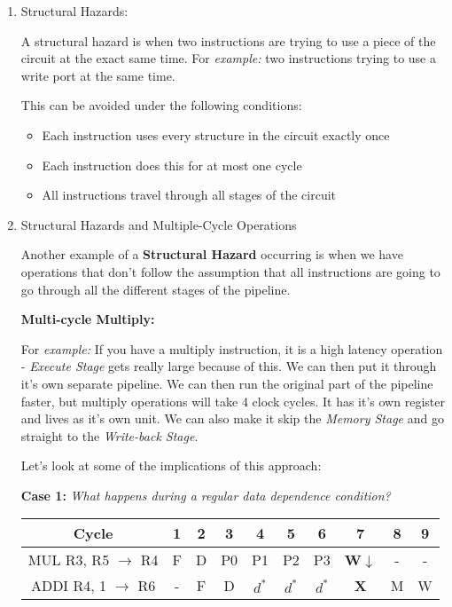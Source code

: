 \documentclass[12pt]{article}
\newenvironment{QandA}{\begin{enumerate}[label=\bfseries\alph*.]\bfseries}
                      {\end{enumerate}}
\newenvironment{answered}{\par\quad\normalfont}{}
\begin{document}
\begin{QandA}
    \item Structural Hazards:
    \begin{answered}
        A structural hazard is when two instructions are trying to use a piece of the circuit at the exact same time. For \textit{example:} two instructions trying to use a write port at the same time. 
        
        This can be avoided under the following conditions:
        \begin{itemize}
            \item Each instruction uses every structure in the circuit exactly once
            \item Each instruction does this for at most one cycle
            \item All instructions travel through all stages of the circuit
        \end{itemize}
    \end{answered}
    
    \item Structural Hazards and Multiple-Cycle Operations
    \begin{answered}
    Another example of a \textbf{Structural Hazard} occurring is when we have operations that don't follow the assumption that all instructions are going to go through all the different stages of the pipeline. 
    
    \textbf{Multi-cycle Multiply:}
    
    For \textit{example:} If you have a multiply instruction, it is a high latency operation - \textit{Execute Stage} gets really large because of this. We can then put it through it's own separate pipeline. We can then run the original part of the pipeline faster, but multiply operations will take 4 clock cycles. It has it's own register and lives as it's own unit. We can also make it skip the \textit{Memory Stage} and go straight to the \textit{Write-back Stage}.
    
    Let's look at some of the implications of this approach:
    
    \textbf{Case 1:} \textit{What happens during a regular data dependence condition?}
    
    \begin{center}
    \begin{tabular}{ |c|c|c|c|c|c|c|c|c|c| } 
     \hline
     Cycle & 1 & 2 & 3 & 4 & 5 & 6 & 7 & 8 & 9\\ 
     \hline
     MUL R3, R5 $\rightarrow$ R4 & F & D & P0 & P1 & P2 & P3 & \textbf{W}$\downarrow$ & - & -\\ 
     ADDI R4, 1 $\rightarrow$ R6 & - & F & D & $d^{*}$ & $d^{*}$ & $d^{*}$ & \textbf{X } & M & W \\ 
     \hline
    \end{tabular}
    \end{center} 
    

\end{answered}
\end{QandA}
\end{document}
